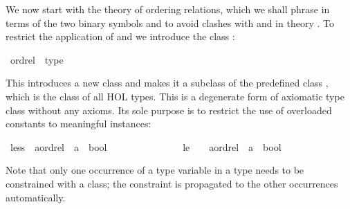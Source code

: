 %
\begin{isabellebody}%
\def\isabellecontext{Overloading{\isadigit{1}}}%
%
\isadelimtheory
%
\endisadelimtheory
%
\isatagtheory
%
\endisatagtheory
{\isafoldtheory}%
%
\isadelimtheory
%
\endisadelimtheory
%
\isamarkuptrue%
%
\begin{isamarkuptext}%
We now start with the theory of ordering relations, which we shall phrase
in terms of the two binary symbols \isa{{\isacharless}{\isacharless}} and \isa{{\isacharless}{\isacharless}{\isacharequal}}
to avoid clashes with \isa{{\isacharless}} and \isa{{\isacharless}{\isacharequal}} in theory . To restrict the application of \isa{{\isacharless}{\isacharless}} and \isa{{\isacharless}{\isacharless}{\isacharequal}} we
introduce the class :%
\end{isamarkuptext}%
\isamarkuptrue%
\isamarkupfalse%
\ ordrel\ {\isacharless}\ type%
\begin{isamarkuptext}%
\noindent
This introduces a new class  and makes it a subclass of
the predefined class , which
is the class of all HOL types.
This is a degenerate form of axiomatic type class without any axioms.
Its sole purpose is to restrict the use of overloaded constants to meaningful
instances:%
\end{isamarkuptext}%
\isamarkuptrue%
\isamarkupfalse%
\ less\ {\isacharcolon}{\isacharcolon}\ {\isachardoublequoteopen}{\isacharparenleft}{\isacharprime}a{\isacharcolon}{\isacharcolon}ordrel{\isacharparenright}\ {\isasymRightarrow}\ {\isacharprime}a\ {\isasymRightarrow}\ bool{\isachardoublequoteclose}\ \ \ \ \ {\isacharparenleft}\ {\isachardoublequoteopen}{\isacharless}{\isacharless}{\isachardoublequoteclose}\ \ {}{}{\isacharparenright}\isanewline
\ \ \ \ \ \ \ le\ \ \ {\isacharcolon}{\isacharcolon}\ {\isachardoublequoteopen}{\isacharparenleft}{\isacharprime}a{\isacharcolon}{\isacharcolon}ordrel{\isacharparenright}\ {\isasymRightarrow}\ {\isacharprime}a\ {\isasymRightarrow}\ bool{\isachardoublequoteclose}\ \ \ \ \ {\isacharparenleft}\ {\isachardoublequoteopen}{\isacharless}{\isacharless}{\isacharequal}{\isachardoublequoteclose}\ {}{}{\isacharparenright}%
\begin{isamarkuptext}%
\noindent
Note that only one occurrence of a type variable in a type needs to be
constrained with a class; the constraint is propagated to the other
occurrences automatically.


\end{isamarkuptext}
\end{isabellebody}
